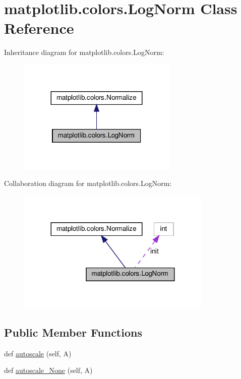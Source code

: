 \hypertarget{classmatplotlib_1_1colors_1_1LogNorm}{}\section{matplotlib.\+colors.\+Log\+Norm Class Reference}
\label{classmatplotlib_1_1colors_1_1LogNorm}


Inheritance diagram for matplotlib.\+colors.\+Log\+Norm\+:
\nopagebreak
\begin{figure}[H]
\begin{center}
\leavevmode
\includegraphics[width=215pt]{classmatplotlib_1_1colors_1_1LogNorm__inherit__graph}
\end{center}
\end{figure}


Collaboration diagram for matplotlib.\+colors.\+Log\+Norm\+:
\nopagebreak
\begin{figure}[H]
\begin{center}
\leavevmode
\includegraphics[width=263pt]{classmatplotlib_1_1colors_1_1LogNorm__coll__graph}
\end{center}
\end{figure}
\subsection*{Public Member Functions}
\begin{DoxyCompactItemize}
\item 
def \hyperlink{classmatplotlib_1_1colors_1_1LogNorm_a933dea7f9ee81f98e421a60df03b27d5}{autoscale} (self, A)
\item 
def \hyperlink{classmatplotlib_1_1colors_1_1LogNorm_af36e717fd109e1d41bc4808aa3f5c266}{autoscale\+\_\+\+None} (self, A)
\end{DoxyCompactItemize}
